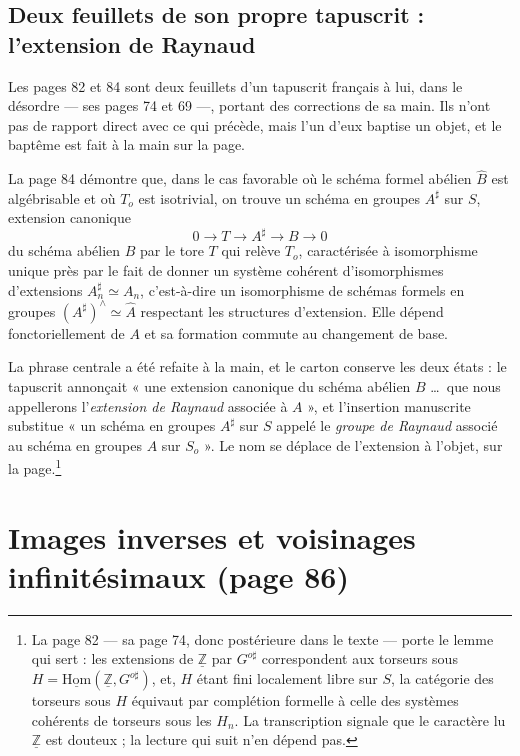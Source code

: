 \documentclass[11pt,a4paper]{article}
\begin{document}
\subsection*{Deux feuillets de son propre tapuscrit : l'extension de Raynaud}

Les pages 82 et 84 sont deux feuillets d'un tapuscrit français à lui, dans le
désordre --- ses pages 74 et 69 ---, portant des corrections de sa main. Ils
n'ont pas de rapport direct avec ce qui précède, mais l'un d'eux baptise un
objet, et le baptême est fait à la main sur la page.

La page 84 démontre que, dans le cas favorable où le schéma formel abélien
$\hat{B}$ est algébrisable et où $T_{o}$ est isotrivial, on trouve un schéma en
groupes $A^{\sharp}$ sur $S$, extension canonique
\[
  0 \longrightarrow T \longrightarrow A^{\sharp} \longrightarrow B
  \longrightarrow 0
\]
du schéma abélien $B$ par le tore $T$ qui relève $T_{o}$, caractérisée à
isomorphisme unique près par le fait de donner un système cohérent
d'isomorphismes d'extensions $A^{\sharp}_{n} \simeq A_{n}$, c'est-à-dire un
isomorphisme de schémas formels en groupes
$(A^{\sharp})^{\wedge} \simeq \hat{A}$ respectant les structures d'extension.
Elle dépend fonctoriellement de $A$ et sa formation commute au changement de
base.

La phrase centrale a été refaite à la main, et le carton conserve les deux
états : le tapuscrit annonçait « une extension canonique du schéma abélien $B$
\dots\ que nous appellerons l'\emph{extension de Raynaud} associée à $A$ », et
l'insertion manuscrite substitue « un schéma en groupes $A^{\sharp}$ sur $S$
appelé le \emph{groupe de Raynaud} associé au schéma en groupes $A$ sur
$S_{o}$ ». Le nom se déplace de l'extension à l'objet, sur la
page.\footnote{La page 82 --- sa page 74, donc postérieure dans le texte ---
porte le lemme qui sert : les extensions de $\underline{\mathbb{Z}}$ par
$G^{o\sharp}$ correspondent aux torseurs sous
$H = \underline{\mathrm{Hom}}(\underline{\mathbb{Z}}, G^{o\sharp})$, et,
$H$ étant fini localement libre sur $S$, la catégorie des torseurs sous $H$
équivaut par complétion formelle à celle des systèmes cohérents de torseurs
sous les $H_{n}$. La transcription signale que le caractère lu
$\underline{\mathbb{Z}}$ est douteux ; la lecture qui suit n'en dépend pas.}

\section*{Images inverses et voisinages infinitésimaux (page 86)}
\end{document}
